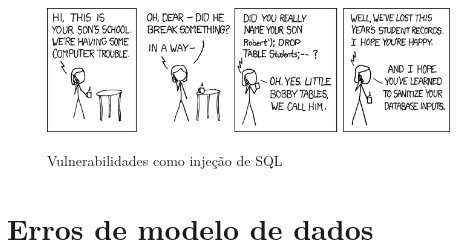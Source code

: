 \begin{figure}
    \centering
    \caption{Vulnerabilidades como injeção de SQL}
	\includegraphics[width=0.95\textwidth]{erros/exploits_of_a_mom.png}
    \label{fig:exploits_of_a_mom}
\end{figure}


\section{Erros de modelo de dados}

